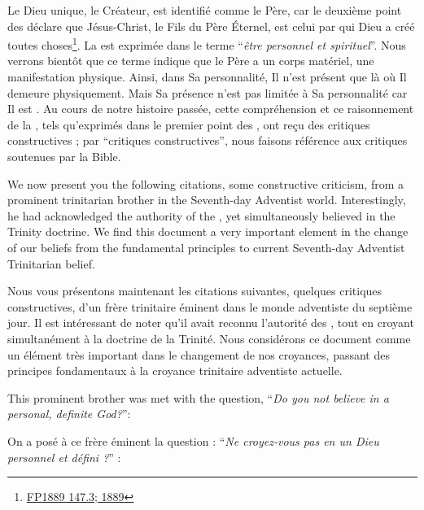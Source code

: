 Le Dieu unique, le Créateur, est identifié comme le Père, car le deuxième point des  déclare que Jésus-Christ, le Fils du Père Éternel, est celui par qui Dieu a créé toutes choses\footnote{\href{https://egwwritings.org/?ref=en_FP1889.147.3&para=931.7}{FP1889 147.3; 1889}}. La  est exprimée dans le terme “\textit{être personnel et spirituel}”. Nous verrons bientôt que ce terme indique que le Père a un corps matériel, une manifestation physique. Ainsi, dans Sa personnalité, Il n'est présent que là où Il demeure physiquement. Mais Sa présence n'est pas limitée à Sa personnalité car Il est . Au cours de notre histoire passée, cette compréhension et ce raisonnement de la , tels qu'exprimés dans le premier point des , ont reçu des critiques constructives ; par “critiques constructives”, nous faisons référence aux critiques soutenues par la Bible.


We now present you the following citations, some constructive criticism, from a prominent trinitarian brother in the Seventh-day Adventist world. Interestingly, he had acknowledged the authority of the , yet simultaneously believed in the Trinity doctrine. We find this document a very important element in the change of our beliefs from the fundamental principles to current Seventh-day Adventist Trinitarian belief.


Nous vous présentons maintenant les citations suivantes, quelques critiques constructives, d'un frère trinitaire éminent dans le monde adventiste du septième jour. Il est intéressant de noter qu'il avait reconnu l'autorité des , tout en croyant simultanément à la doctrine de la Trinité. Nous considérons ce document comme un élément très important dans le changement de nos croyances, passant des principes fondamentaux à la croyance trinitaire adventiste actuelle.


This prominent brother was met with the question, “\textit{Do you not believe in a personal, definite God?}”:


On a posé à ce frère éminent la question : “\textit{Ne croyez-vous pas en un Dieu personnel et défini ?}” :




